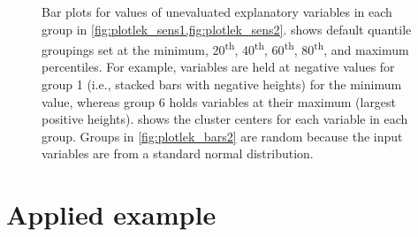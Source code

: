 \documentclass[article,shortnames]{jss}
\begin{document}
\begin{figure}
\centering
{}

\caption{Bar plots for values of unevaluated explanatory variables in each group in \cref{fig:plotlek_sens1,fig:plotlek_sens2}.   shows default quantile groupings set at the minimum, 20\textsuperscript{th}, 40\textsuperscript{th}, 60\textsuperscript{th}, 80\textsuperscript{th}, and maximum percentiles.  For example, variables are held at negative values for group 1 (i.e., stacked bars with negative heights) for the minimum value, whereas group 6 holds variables at their maximum (largest positive heights).  shows the cluster centers for each variable in each group.  Groups in \cref{fig:plotlek_bars2} are random because the input variables are from a standard normal distribution.}
\label{fig:plotlek_bars}
\end{figure}

\section[Applied example]{Applied example}
\end{document}

